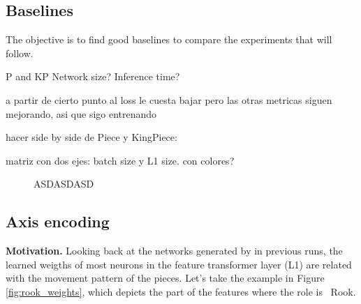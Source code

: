 \subsection{Baselines}

The objective is to find good baselines to compare the experiments that will follow.

P and KP
Network size?
Inference time?

a partir de cierto punto al loss le cuesta bajar pero las otras metricas siguen mejorando, asi que sigo entrenando

hacer side by side de Piece y KingPiece:

matriz con dos ejes: batch size y L1 size. con colores?

\begin{figure}[H]
\centering
{}
\caption{ASDASDASD}
\label{fig:asdasdasd}
\end{figure}



\newpage
\subsection{Axis encoding} %
\label{sec:axis_encoding}

\newcommand{\axisarrows}[1]{\parbox{0.7cm}{\texttt{[image: ../assets/arrows/\#1.pdf]}}}
\newcommand{\axisarrowsSM}[1]{\parbox{0.6cm}{\texttt{[image: ../assets/arrows/\#1.pdf]}}}

\textbf{Motivation.} Looking back at the networks generated by  in previous runs, the learned weigths of most neurons in the feature transformer layer (L1) are related with the movement pattern of the pieces. Let's take the example in Figure \ref{fig:rook_weights}, which depicts the  part of the features where the role is \symrook\ Rook.

